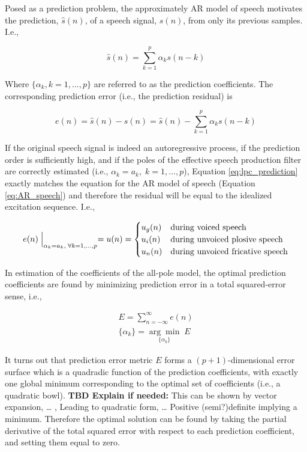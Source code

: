 Posed as a prediction problem, the approximately AR model of speech motivates the prediction, $\hat{s}(n)$, of a speech signal, $s(n)$, from only its previous samples. I.e.,

\begin{equation}
	\hat{s}(n) = \sum_{k=1}^{p}\alpha_k s(n-k) \label{eq:lpc_prediction}
\end{equation}

\noindent
Where $\{\alpha_k, k=1,\dots,p\}$ are referred to as the prediction coefficients. The corresponding prediction error (i.e., the prediction residual) is

\begin{equation}
	e(n)= \hat{s}(n)  - s(n) =  \hat{s}(n)  - \sum_{k=1}^{p}\alpha_k s(n-k) \label{eq:lpc_error}
\end{equation}


If the original speech signal is indeed an autoregressive process, if the prediction order is sufficiently high, and if the poles of the effective speech production filter are correctly estimated (i.e., $\alpha_k=a_k, \; k=1,\dots,p$), Equation \ref{eq:lpc_prediction} exactly matches the equation for the AR model of speech (Equation \ref{eq:AR_speech}) and therefore the residual will be equal to the idealized excitation sequence. I.e., 

\begin{equation}
	e(n)\Bigm|_{\alpha_k=a_k, \; \forall k=1,\dots,p} = u(n) = 
	\begin{cases} 
		u_g(n) & \text{during voiced speech} \\
		u_i(n)  & \text{during unvoiced plosive speech} \\
		u_n(n) & \text{during unvoiced fricative speech} \\
	\end{cases}
\end{equation}

In estimation of the coefficients of the all-pole model, the optimal prediction coefficients are found by minimizing prediction error in a total squared-error sense, i.e.,

\begin{eqnarray}
	E = \sum_{n=-\infty}^{\infty}e(n) \\ 
	\{\alpha_k\} = \underset{\{\alpha_k\}}{\arg\min}\;E
\end{eqnarray}

\noindent
It turns out that prediction error metric $E$ forms a $(p+1)$-dimensional error surface which is a quadradic function of the prediction coefficients, with exactly one global minimum corresponding to the optimal set of coefficients (i.e., a quadratic bowl). \textbf{TBD Explain if needed:} This can be shown by vector expansion, … , Leading to quadratic form, … Positive (semi?)definite implying a minimum. Therefore the optimal solution can be found by taking the partial derivative of the total squared error with respect to each prediction coefficient, and setting them equal to zero.

